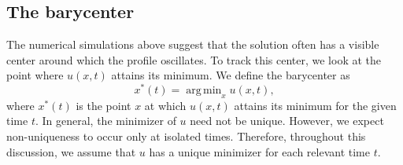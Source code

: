 \documentclass[english,master]{liumaiex}
\theoremstyle{thesisplain}
\theoremstyle{thesisdefinition}
\DeclareMathOperator*{\argmin}{arg\,min}
\numberwithin{equation}{section}
\begin{document}
\subsection{The barycenter}

The numerical simulations above suggest that the solution often has a visible center around which the profile oscillates. To track this center, we look at the point where $u(x,t)$ attains its minimum. We define the barycenter as
\begin{equation}
	x^*(t) = \argmin_x u(x, t),
\end{equation}
where $x^*(t)$ is the point $x$ at which $u(x,t)$ attains its minimum for the given time $t$. In general, the minimizer of $u$ need not be unique. However, we expect non-uniqueness to occur only at isolated times. Therefore, throughout this discussion, we assume that $u$ has a unique minimizer for each relevant time $t$.
\end{document}
